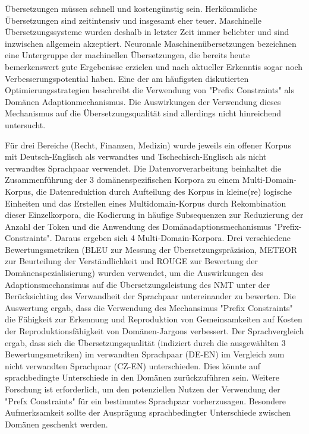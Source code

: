 Übersetzungen müssen schnell und kostengünstig sein.
Herkömmliche Übersetzungen sind zeitintensiv und insgesamt eher teuer.
Maschinelle Übersetzungssysteme wurden deshalb in letzter Zeit immer beliebter und sind inzwischen allgemein akzeptiert.
Neuronale Maschinenübersetzungen bezeichnen eine Untergruppe der machinellen Übersetzungen, die bereits heute bemerkenswert gute Ergebenisse erzielen und nach aktueller Erkenntis sogar noch Verbesserungspotential haben.
Eine der am häufigsten diskutierten Optimierungsstrategien beschreibt die Verwendung von "Prefix Constraints" als Domänen Adaptionmechanismus.
Die Auswirkungen der Verwendung dieses Mechanismus auf die Übersetzungsqualität sind allerdings nicht hinreichend untersucht.

Für drei Bereiche (Recht, Finanzen, Medizin) wurde jeweils ein offener Korpus mit Deutsch-Englisch als verwandtes und Tschechisch-Englisch als nicht verwandtes Sprachpaar verwendet.
Die Datenvorverarbeitung beinhaltet die Zusammenführung der 3 domänenspezifischen Korpora zu einem Multi-Domain-Korpus, die Datenreduktion durch Aufteilung des Korpus in kleine(re) logische Einheiten und das Erstellen eines Multidomain-Korpus durch Rekombination dieser Einzelkorpora, die Kodierung in häufige Subsequenzen zur Reduzierung der Anzahl der Token und die Anwendung des Domänadaptionsmechanismus "Prefix-Constraints". Daraus ergeben sich 4 Multi-Domain-Korpora.
Drei verschiedene Bewertungsmetriken (BLEU zur Messung der Übersetzungspräzision, METEOR zur Beurteilung der Verständlichkeit und ROUGE zur Bewertung der Domänenspezialisierung) wurden verwendet, um die Auswirkungen des Adaptionsmechansimus auf die Übersetzungsleistung des NMT unter der Berücksichting des Verwandheit der Sprachpaar untereinander zu bewerten.
Die Auswertung ergab, dass die Verwendung des Mechansimus "Prefix Constraints" die Fähigkeit zur Erkennung und Reproduktion von Gemeinsamkeiten auf Kosten der Reproduktionsfähigkeit von Domänen-Jargons verbessert.
Der Sprachvergleich ergab, dass sich die Übersetzungsqualität (indiziert durch die ausgewählten 3 Bewertungsmetriken) im verwandten Sprachpaar (DE-EN) im Vergleich zum nicht verwandten Sprachpaar (CZ-EN) unterschieden.
Dies könnte auf sprachbedingte Unterschiede in den Domänen zurückzuführen sein.
Weitere Forschung ist erforderlich, um den potenziellen Nutzen der Verwendung der "Prefx Constraints" für ein bestimmtes Sprachpaar vorherzusagen.
Besondere Aufmerksamkeit sollte der Ausprägung sprachbedingter Unterschiede zwischen Domänen geschenkt werden. 

